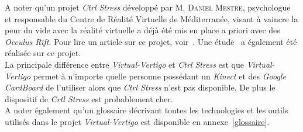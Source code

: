 A noter qu'un projet \textit{Ctrl Stress} développé par \textsc{M. Daniel Mestre}, psychologue et responsable du \textsf{Centre de Réalité Virtuelle de Méditerranée}, visant à vaincre la peur du vide avec la réalité virtuelle a déjà été mis en place a priori avec des \textit{Occulus Rift}. Pour lire un article sur ce projet, voir~\cite{cnrs}. Une étude~\cite{etude} a également été réalisée sur ce projet.\\
La principale différence entre \textit{Virtual-Vertigo} et \textit{Ctrl Stress} est que \textit{Virtual-Vertigo} permet à n'importe quelle personne possédant un \textit{Kinect} et des \textit{Google CardBoard} de l'utiliser alors que \textit{Ctrl Stress} n'est pas disponible. De plus le dispositif de \textit{Crtl Stress} est probablement cher.\\

A noter également qu'un glossaire décrivant toutes les technologies et les outils utilisés dans le projet \textit{Virtual-Vertigo} est disponible en annexe~\ref{glossaire}.


